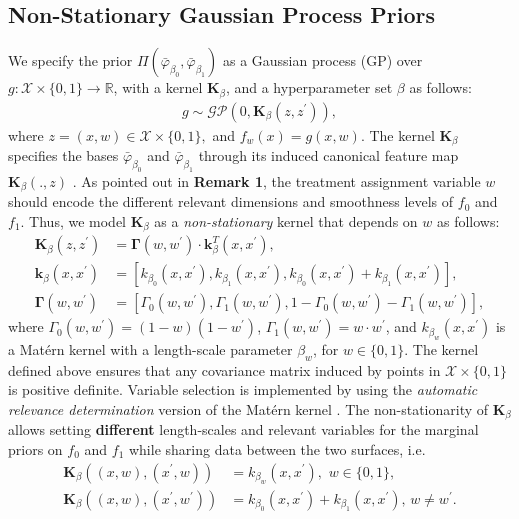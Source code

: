 \documentclass [PhD] {uclathes}
\begin{document}
\subsection{Non-Stationary Gaussian Process Priors} 
\label{ch2sec41} 
We specify the prior $\Pi(\bar{\varphi}_{\beta_0},\bar{\varphi}_{\beta_1})$ as a Gaussian process (GP) over $g: \mathcal{X} \times \{0,1\} \to \mathbb{R}$, with a kernel $\boldsymbol{K}_{\beta}$, and a hyperparameter set $\beta$ as follows:
\begin{align}  
g \sim \mathcal{GP}\left(0,\boldsymbol{K}_{\beta}(z,z^{\prime})\right),
\label{ch2eq9}
\end{align}
where $z = (x,w) \in \mathcal{X} \times \{0,1\},$ and $f_w(x) = g(x,w)$. The kernel $\boldsymbol{K}_{\beta}$ specifies the bases $\bar{\varphi}_{\beta_0}$ and $\bar{\varphi}_{\beta_1}$ through its induced canonical feature map $\boldsymbol{K}_{\beta}(.,z)$ \cite{rasmussen2006gaussian,alvarez2012kernels}. As pointed out in \textbf{Remark 1}, the treatment assignment variable $w$ should encode the different relevant dimensions and smoothness levels of $f_0$ and $f_1$. Thus, we model $\boldsymbol{K}_{\beta}$ as a \textit{non-stationary} kernel that depends on $w$ as follows:      
\begin{align}  
\boldsymbol{K}_{\beta}(z,z^{\prime}) &= \boldsymbol{\Gamma}(w,w^{\prime}) \cdot \boldsymbol{k}_{\beta}^{T}(x,x^{\prime}), \nonumber \\
\boldsymbol{k}_{\beta}(x,x^{\prime}) &= \left[k_{\beta_0}(x,x^{\prime}),k_{\beta_1}(x,x^{\prime}),k_{\beta_0}(x,x^{\prime}) + k_{\beta_1}(x,x^{\prime})\right], \nonumber \\
\boldsymbol{\Gamma}(w,w^{\prime}) &= \left[\Gamma_{0}(w,w^{\prime}),\Gamma_{1}(w,w^{\prime}),1-\Gamma_{0}(w,w^{\prime})-\Gamma_{1}(w,w^{\prime})\right], \nonumber
\end{align}
where $\Gamma_{0}(w,w^{\prime}) = (1-w)(1-w^{\prime})$, $\Gamma_{1}(w,w^{\prime}) = w\cdot w^{\prime}$, and $k_{\beta_w}(x,x^{\prime})$ is a Mat\'ern kernel with a length-scale parameter $\beta_w$, for $w \in \{0,1\}$. The kernel defined above ensures that any covariance matrix induced by points in $\mathcal{X}\times\{0,1\}$ is positive definite. Variable selection is implemented by using the \textit{automatic relevance determination} version of the Mat\'ern kernel \cite{rasmussen2006gaussian}. The non-stationarity of $\boldsymbol{K}_{\beta}$ allows setting \textbf{different} length-scales and relevant variables for the marginal priors on $f_0$ and $f_1$ while sharing data between the two surfaces, i.e.
\begin{align}  
\boldsymbol{K}_{\beta}((x,w),(x^{\prime},w)) &= k_{\beta_w}(x,x^{\prime}),\,\, w \in \{0,1\}, \nonumber \\
\boldsymbol{K}_{\beta}((x,w),(x^{\prime},w^{\prime})) &= k_{\beta_0}(x,x^{\prime}) + k_{\beta_1}(x,x^{\prime}),\, w \neq w^{\prime}.
\label{ch2eq10}
\end{align}
\end{document}
